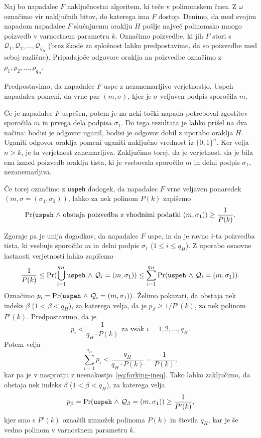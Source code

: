 \begin{dokaz}
    Naj bo napadalec $F$ naključnostni algoritem, ki teče v polinomskem času. Z $\omega$ označimo
    vir naključnih bitov, do katerega ima $F$ dostop. Denimo, da med svojim napadom napadalec  $F$
    slučajnemu oraklju $H$ pošlje največ polinomsko mnogo poizvedb v varnostnem parametru $k$. Označimo
    poizvedbe, ki jih $F$ stori s $\mathcal{Q}_1, \mathcal{Q}_2, \dots,\allowbreak \mathcal{Q}_{q_H}$ (brez
    škode za splošnost lahko predpostavimo, da so poizvedbe med seboj različne). Pripadajoče odgovore
    oraklja na poizvedbe označimo z $\rho_1, \rho_2 , \dots, \rho_{q_H}$.

    Predpostavimo, da napadalec $F$ uspe z nezanemarljivo verjetnostjo. Uspeh napadalca pomeni, da
    vrne par $(m, \sigma)$, kjer je $\sigma$ veljaven podpis sporočila $m$.

    Če je napadalec $F$ uspešen, potem je na neki točki napada potreboval zgostitev sporočila $m$
    in prvega dela podpisa $\sigma_1$. Do tega rezultata je lahko prišel na dva načina: bodisi je
    odgovor uganil, bodisi je odgovor dobil z uporabo oraklja $H$. Uganiti odgovor oraklja pomeni
    uganiti naključno vrednost iz $\{0, 1\}^n$. Ker velja $n > k$, je ta verjetnost zanemarljiva.
    Zaključimo torej, da je verjetnost, da je bila ena izmed poizvedb oraklju tista, ki je vsebovala
    sporočilo $m$ in delni podpis $\sigma_1$, nezanemarljiva.

    Če torej označimo z \texttt{uspeh} dodogek, da napadalec $F$ vrne veljaven ponaredek
    $(m, \sigma = (\sigma_1, \sigma_2))$, lahko za nek polinom $P(k)$ zapišemo
    $$
    \Pr(\text{\texttt{uspeh} $\wedge$ obstaja poizvedba z vhodnimi podatki $(m, \sigma_1)$}) \geq \frac{1}{P(k)}.
    $$

    Zgornje pa je unija dogodkov, da napadalec $F$ uspe, in da je ravno $i$-ta poizvedba
    tista, ki vsebuje sporočilo $m$ in delni podpis $\sigma_1$ ($1 \leq i \leq q_H$). Z uporabo osnovne
    lastnosti verjetnosti lahko zapišemo
    \begin{equation}
    \frac{1}{P(k)} \leq \Pr(\bigcup_{i = 1}^{q_H} \text{\texttt{uspeh} $\wedge$ $\mathcal{Q}_i = (m, \sigma_1)$})
    \leq \sum_{i = 1}^{q_H} \Pr(\text{\texttt{uspeh} $\wedge$ $\mathcal{Q}_i = (m, \sigma_1)$}).
    \label{eq:forking-ineq}
    \end{equation}
    Označimo $p_i = \Pr(\text{\texttt{uspeh} $\wedge$ $\mathcal{Q}_i = (m, \sigma_1)$})$.
    Želimo pokazati, da obstaja nek indeks $\beta$ ($1 < \beta < q_H$), za katerega velja, da je
    $p_\beta \geq 1/P'(k)$, za nek polinom $P'(k)$. Predpostavimo, da je
    $$
    p_i < \frac{1}{q_H \cdot P(k)} \text{ za vsak } i = 1, 2, \dots, q_H.
    $$
    Potem velja
    $$
    \sum_{i = 1}^{q_H} p_i < \frac{q_H}{q_H \cdot P(k)} = \frac{1}{P(k)},
    $$
    kar pa je v nasprotju z neenakostjo~\eqref{eq:forking-ineq}. Tako lahko zaključimo, da obstaja
    nek indeks $\beta$ ($1 < \beta < q_H$), za katerega velja
    $$
    p_\beta = \Pr(\text{\texttt{uspeh} $\wedge$ $\mathcal{Q}_\beta = (m, \sigma_1)$})
    \geq \frac{1}{P'(k)},
    $$
    kjer smo s $P'(k)$ označili zmnožek polinoma $P(k)$ in števila $q_H$, kar je še vedno polinom
    v varnostnem parametru $k$.


\end{dokaz}
